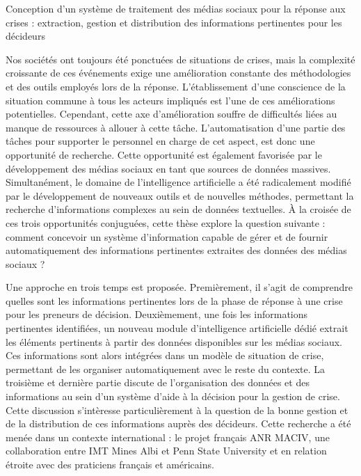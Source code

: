 \cleardoublepage
\pagestyle{empty}
\null
\newpage
{}%
{Conception d'un système de traitement des médias sociaux pour la réponse aux crises : extraction, gestion et distribution des informations pertinentes pour les décideurs}%
{
  Nos sociétés ont toujours été ponctuées de situations de crises, mais la complexité croissante de ces
  événements exige une amélioration constante des méthodologies et des outils employés lors de la réponse.
  L'établissement d'une conscience de la situation commune à tous les acteurs impliqués est l'une de ces améliorations
  potentielles.
  Cependant, cette axe d'amélioration souffre de difficultés liées au manque de ressources à allouer à cette tâche.
  L'automatisation d'une partie des tâches pour supporter le personnel en charge de cet aspect, est donc une opportunité de recherche.
  Cette opportunité est également favorisée par le développement des médias sociaux en tant que sources de données massives.
  Simultanément, le domaine de l'intelligence artificielle a été radicalement modifié par
  le développement de nouveaux outils et de nouvelles méthodes, permettant la recherche
  d'informations complexes au sein de données textuelles.
  À la croisée de ces trois opportunités conjuguées, cette thèse explore la question suivante :
  comment concevoir un système d'information capable de gérer et de fournir automatiquement
  des informations pertinentes extraites des données des médias sociaux ?

  Une approche en trois temps est proposée. Premièrement, il s'agit de comprendre
  quelles sont les informations pertinentes lors de la phase de réponse à une crise pour les preneurs de décision.
  Deuxièmement, une fois les informations pertinentes identifiées, un nouveau module d'intelligence
  artificielle dédié extrait les éléments pertinents à partir des données disponibles sur les médias sociaux.
  Ces informations sont alors intégrées dans un modèle de situation de crise, permettant
  de les organiser automatiquement avec le reste du contexte.
  La troisième et dernière partie discute de l'organisation des données et
  des informations au sein d'un système d'aide à la décision pour la gestion de crise.
  Cette discussion s'intèresse particulièrement à la question de la bonne gestion et de
  la distribution de ces informations auprès des décideurs.
  Cette recherche a été menée dans un contexte international : le projet français ANR
  MACIV, une collaboration entre IMT Mines Albi et Penn State University et en relation
  étroite avec des praticiens français et américains.

}
